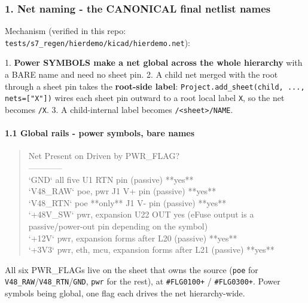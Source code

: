\documentclass[11pt,a4paper]{article}
\begin{document}
\subsubsection*{1. Net naming - the CANONICAL final netlist names}
Mechanism (verified in this repo: \texttt{tests/s7\_regen/hierdemo/kicad/hierdemo.net}):

1. \textbf{Power SYMBOLS make a net global across the whole hierarchy} with a BARE name and need no sheet pin. 2. A child net merged with the root through a sheet pin takes the \textbf{root-side label}: \texttt{Project.add\_sheet(child, ..., nets={[}"X"{]})} wires each sheet pin outward to a root local label \texttt{X}, so the net becomes \texttt{/X}. 3. A child-internal label becomes \texttt{/\textless{}sheet\textgreater{}/NAME}.

\paragraph*{1.1 Global rails - power symbols, bare names}
\begin{quote}\small\ttfamily\raggedright
\textbar{} Net \textbar{} Present on \textbar{} Driven by \textbar{} PWR\_FLAG? \textbar{}\\
\textbar{}---\textbar{}---\textbar{}---\textbar{}---\textbar{}\\
\textbar{} `GND` \textbar{} all five \textbar{} U1 RTN pin (passive) \textbar{} {*}{*}yes{*}{*} \textbar{}\\
\textbar{} `V48\_RAW` \textbar{} poe, pwr \textbar{} J1 V+ pin (passive) \textbar{} {*}{*}yes{*}{*} \textbar{}\\
\textbar{} `V48\_RTN` \textbar{} poe {*}{*}only{*}{*} \textbar{} J1 V- pin (passive) \textbar{} {*}{*}yes{*}{*} \textbar{}\\
\textbar{} `+48V\_SW` \textbar{} pwr, expansion \textbar{} U22 OUT \textbar{} yes (eFuse output is a passive/power-out pin depending on the symbol) \textbar{}\\
\textbar{} `+12V` \textbar{} pwr, expansion \textbar{} forms after L20 (passive) \textbar{} {*}{*}yes{*}{*} \textbar{}\\
\textbar{} `+3V3` \textbar{} pwr, eth, mcu, expansion \textbar{} forms after L21 (passive) \textbar{} {*}{*}yes{*}{*} \textbar{}
\end{quote}
All six PWR\_FLAGs live on the sheet that owns the source (\texttt{poe} for \texttt{V48\_RAW}/\texttt{V48\_RTN}/\texttt{GND}, \texttt{pwr} for the rest), at \texttt{\#FLG0100+} / \texttt{\#FLG0300+}. Power symbols being global, one flag each drives the net hierarchy-wide.
\end{document}
